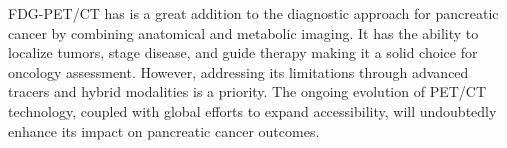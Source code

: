 
FDG-PET/CT has is a great addition to the diagnostic approach for pancreatic cancer by combining anatomical and metabolic imaging. It has the ability to localize tumors, stage disease, and guide therapy making it a solid choice for oncology assessment. However, addressing its limitations through advanced tracers and hybrid modalities is a priority. The ongoing evolution of PET/CT technology, coupled with global efforts to expand accessibility, will undoubtedly enhance its impact on pancreatic cancer outcomes.
